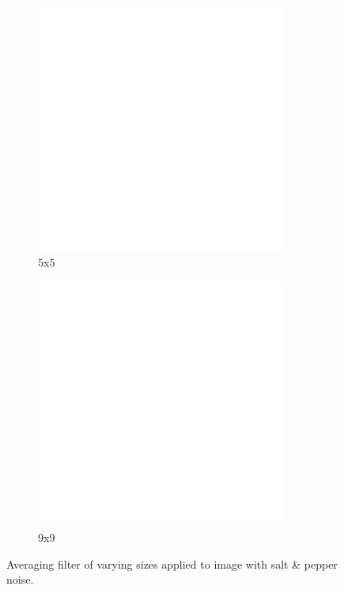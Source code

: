 \begin{figure}[H]
    \begin{subfigure}[b]{0.3\textwidth}
        \includegraphics[width=0.9\textwidth]{../code/2_out/2-1_sp_5x5.png}
        \caption{5x5}
        \label{fig:2-1:3}
    \end{subfigure}
    \begin{subfigure}[b]{0.3\textwidth}
        \includegraphics[width=0.9\textwidth]{../code/2_out/2-1_sp_9x9.png}
        \caption{9x9}
        \label{fig:2-1:4}
    \end{subfigure}

    \label{fig:2-1}
    \caption{Averaging filter of varying sizes applied to image with salt \& pepper noise.}
\end{figure}
